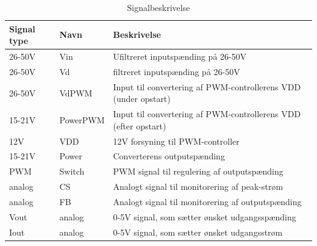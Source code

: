 \begin{table}[htbp]
	\centering
	\begin{tabular}{|l|l|l|}
		\hline
		\textbf{Signal type} 	&\textbf{Navn}		&\textbf{Beskrivelse} \\\hline
		26-50V			&Vin		&Ufiltreret inputspænding på 26-50V\\\hline
		26-50V			&Vd			&filtreret inputspænding på 26-50V\\\hline
		26-50V			&VdPWM			&Input til convertering af PWM-controllerens VDD (under opstart)\\\hline
		15-21V			&PowerPWM		&Input til convertering af PWM-controllerens VDD (efter opstart)\\\hline
		12V				&VDD		&12V forsyning til PWM-controller\\\hline
		15-21V			&Power		&Converterens outputspænding\\\hline
		PWM				&Switch		&PWM signal til regulering af outputspænding\\\hline
		analog			&CS			&Analogt signal til monitorering af peak-strøm   \\\hline	
		analog			&FB			&Analogt signal til monitorering af outputspænding\\\hline
		Vout			&analog		&0-5V signal, som sætter ønsket udgangsspænding\\\hline
		Iout			&analog		&0-5V signal, som sætter ønsket udgangsstrøm\\\hline
		
	\end{tabular}
	\caption{Signalbeskrivelse}
	\label{tabel: Signalbeskrivelse}
\end{table}

